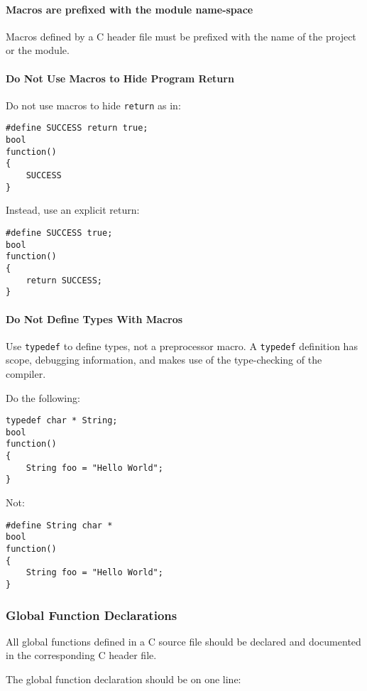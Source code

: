 \documentclass[fleqn,12pt]{PARCOneColumn} %
\begin{document}
\paragraph{Macros are prefixed with the module name-space}
Macros defined by a C header file must be prefixed with the name of the project or the module.

\paragraph{Do Not Use Macros to Hide Program Return}
Do not use macros to hide {\tt return} as in:

\begin{lstlisting}[backgroundcolor=\color{badCodeColor}]
#define SUCCESS return true;
bool
function()
{
	SUCCESS
}
\end{lstlisting}

Instead, use an explicit return:
\begin{lstlisting}[backgroundcolor=\color{goodCodeColor}]
#define SUCCESS true;
bool
function()
{
	return SUCCESS;
}
\end{lstlisting}

\paragraph{Do Not Define Types With Macros}
Use {\tt typedef} to define types, not a preprocessor macro.
A {\tt typedef} definition has scope, debugging information, and makes use of the type-checking of the compiler.

Do the following:
\begin{lstlisting}[backgroundcolor=\color{goodCodeColor}]
typedef char * String;
bool
function()
{
	String foo = "Hello World";
}
\end{lstlisting}

Not:

\begin{lstlisting}[backgroundcolor=\color{badCodeColor}]
#define String char *
bool
function()
{
	String foo = "Hello World";
}
\end{lstlisting}

\subsubsection{Global Function Declarations}
All global functions defined in a C source file should be declared and documented in the corresponding C header file.

The global function declaration should be on one line:
\end{document}
